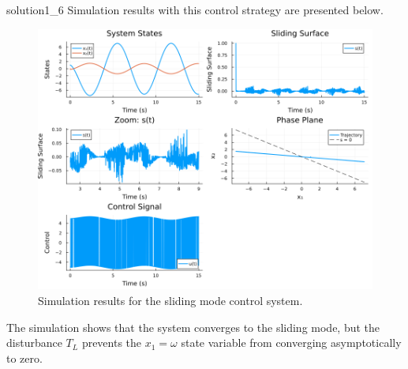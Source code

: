 \begin{solution}{}{solution1_6}
	Simulation results with this control strategy are presented below.

    \begin{figure}[H]
        \centering
        \includegraphics[width=1\textwidth]{img/problem1_6.png}
        \caption{Simulation results for the sliding mode control system.}
        \label{fig:problem1_6}
    \end{figure}
    The simulation shows that the system converges to the sliding mode, but the disturbance \( T_L \) prevents the $x_1 = \omega$ state variable from converging asymptotically to zero.
\end{solution}
